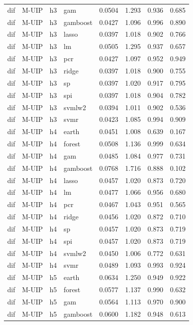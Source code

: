 \begin{ThreePartTable}
\begin{longtable}[t]{llclcccc}
dif & M-UIP & h3 & gam & 0.0504 & 1.293 & 0.936 & 0.685\\
dif & M-UIP & h3 & gamboost & 0.0427 & 1.096 & 0.996 & 0.890\\
dif & M-UIP & h3 & lasso & 0.0397 & 1.018 & 0.902 & 0.766\\
dif & M-UIP & h3 & lm & 0.0505 & 1.295 & 0.937 & 0.657\\
dif & M-UIP & h3 & pcr & 0.0427 & 1.097 & 0.952 & 0.949\\
dif & M-UIP & h3 & ridge & 0.0397 & 1.018 & 0.900 & 0.755\\
dif & M-UIP & h3 & sp & 0.0397 & 1.020 & 0.917 & 0.795\\
dif & M-UIP & h3 & spi & 0.0397 & 1.018 & 0.904 & 0.782\\
dif & M-UIP & h3 & svmlw2 & 0.0394 & 1.011 & 0.902 & 0.536\\
dif & M-UIP & h3 & svmr & 0.0423 & 1.085 & 0.994 & 0.909\\
\addlinespace
dif & M-UIP & h4 & earth & 0.0451 & 1.008 & 0.639 & 0.167\\
dif & M-UIP & h4 & forest & 0.0508 & 1.136 & 0.999 & 0.634\\
dif & M-UIP & h4 & gam & 0.0485 & 1.084 & 0.977 & 0.731\\
dif & M-UIP & h4 & gamboost & 0.0768 & 1.716 & 0.888 & 0.102\\
dif & M-UIP & h4 & lasso & 0.0457 & 1.020 & 0.873 & 0.720\\
dif & M-UIP & h4 & lm & 0.0477 & 1.066 & 0.956 & 0.680\\
dif & M-UIP & h4 & pcr & 0.0467 & 1.043 & 0.951 & 0.565\\
dif & M-UIP & h4 & ridge & 0.0456 & 1.020 & 0.872 & 0.710\\
dif & M-UIP & h4 & sp & 0.0457 & 1.020 & 0.873 & 0.719\\
dif & M-UIP & h4 & spi & 0.0457 & 1.020 & 0.873 & 0.719\\
dif & M-UIP & h4 & svmlw2 & 0.0450 & 1.006 & 0.772 & 0.631\\
dif & M-UIP & h4 & svmr & 0.0489 & 1.093 & 0.993 & 0.924\\
\addlinespace
dif & M-UIP & h5 & earth & 0.0634 & 1.250 & 0.949 & 0.922\\
dif & M-UIP & h5 & forest & 0.0577 & 1.137 & 0.990 & 0.632\\
dif & M-UIP & h5 & gam & 0.0564 & 1.113 & 0.970 & 0.900\\
dif & M-UIP & h5 & gamboost & 0.0600 & 1.182 & 0.948 & 0.613\\

\end{longtable}
\end{ThreePartTable}
